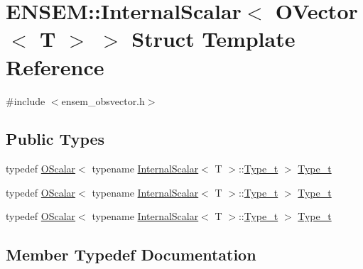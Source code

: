 \hypertarget{structENSEM_1_1InternalScalar_3_01OVector_3_01T_01_4_01_4}{}\section{E\+N\+S\+EM\+:\+:Internal\+Scalar$<$ O\+Vector$<$ T $>$ $>$ Struct Template Reference}
\label{structENSEM_1_1InternalScalar_3_01OVector_3_01T_01_4_01_4}


{\ttfamily \#include $<$ensem\+\_\+obsvector.\+h$>$}

\subsection*{Public Types}
\begin{DoxyCompactItemize}
\item 
typedef \mbox{\hyperlink{classENSEM_1_1OScalar}{O\+Scalar}}$<$ typename \mbox{\hyperlink{structENSEM_1_1InternalScalar}{Internal\+Scalar}}$<$ T $>$\+::\mbox{\hyperlink{structENSEM_1_1InternalScalar_3_01OVector_3_01T_01_4_01_4_a61185c961c0397adc786d26e877adba9}{Type\+\_\+t}} $>$ \mbox{\hyperlink{structENSEM_1_1InternalScalar_3_01OVector_3_01T_01_4_01_4_a61185c961c0397adc786d26e877adba9}{Type\+\_\+t}}
\item 
typedef \mbox{\hyperlink{classENSEM_1_1OScalar}{O\+Scalar}}$<$ typename \mbox{\hyperlink{structENSEM_1_1InternalScalar}{Internal\+Scalar}}$<$ T $>$\+::\mbox{\hyperlink{structENSEM_1_1InternalScalar_3_01OVector_3_01T_01_4_01_4_a61185c961c0397adc786d26e877adba9}{Type\+\_\+t}} $>$ \mbox{\hyperlink{structENSEM_1_1InternalScalar_3_01OVector_3_01T_01_4_01_4_a61185c961c0397adc786d26e877adba9}{Type\+\_\+t}}
\item 
typedef \mbox{\hyperlink{classENSEM_1_1OScalar}{O\+Scalar}}$<$ typename \mbox{\hyperlink{structENSEM_1_1InternalScalar}{Internal\+Scalar}}$<$ T $>$\+::\mbox{\hyperlink{structENSEM_1_1InternalScalar_3_01OVector_3_01T_01_4_01_4_a61185c961c0397adc786d26e877adba9}{Type\+\_\+t}} $>$ \mbox{\hyperlink{structENSEM_1_1InternalScalar_3_01OVector_3_01T_01_4_01_4_a61185c961c0397adc786d26e877adba9}{Type\+\_\+t}}
\end{DoxyCompactItemize}


\subsection{Member Typedef Documentation}
\mbox{\label{structENSEM_1_1InternalScalar_3_01OVector_3_01T_01_4_01_4_a61185c961c0397adc786d26e877adba9}} 
